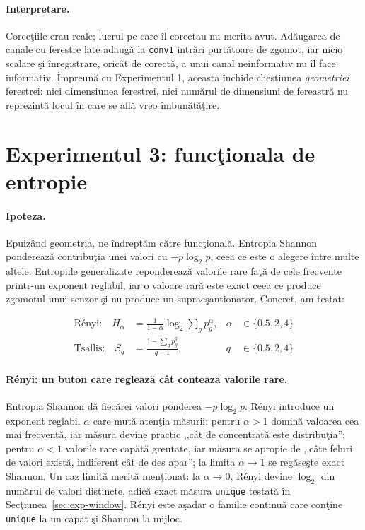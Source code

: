 \paragraph{Interpretare.} Corecţiile erau reale; lucrul pe care îl corectau nu
merita avut. Adăugarea de canale cu ferestre late adaugă la \texttt{conv1}
intrări purtătoare de zgomot, iar nicio scalare şi înregistrare, oricât de
corectă, a unui canal neinformativ nu îl face informativ. Împreună cu
Experimentul 1, aceasta închide chestiunea \emph{geometriei} ferestrei: nici
dimensiunea ferestrei, nici numărul de dimensiuni de fereastră nu reprezintă
locul în care se află vreo îmbunătăţire.

\section{Experimentul 3: funcţionala de entropie}
\label{sec:exp-entropy}

\paragraph{Ipoteza.} Epuizând geometria, ne îndreptăm către funcţională.
Entropia Shannon ponderează contribuţia unei valori cu $-p\log_2 p$, ceea ce
este o alegere între multe altele. Entropiile generalizate reponderează valorile
rare faţă de cele frecvente printr-un exponent reglabil, iar o valoare rară este
exact ceea ce produce zgomotul unui senzor şi nu produce un supraeşantionator.
Concret, am testat:

\begin{align}
  \text{Rényi:}   \quad H_\alpha &= \frac{1}{1-\alpha}\log_2 \sum_g p_g^{\alpha},
  & \alpha &\in \{0.5, 2, 4\} \label{eq:renyi}\\
  \text{Tsallis:} \quad S_q      &= \frac{1 - \sum_g p_g^{q}}{q-1},
  & q &\in \{0.5, 2, 4\} \label{eq:tsallis}
\end{align}

\paragraph{Rényi: un buton care reglează cât contează valorile rare.} Entropia
Shannon dă fiecărei valori ponderea $-p\log_2 p$. Rényi introduce un exponent
reglabil $\alpha$ care mută atenţia măsurii: pentru $\alpha > 1$ domină valoarea
cea mai frecventă, iar măsura devine practic ,,cât de concentrată este
distribuţia''; pentru $\alpha < 1$ valorile rare capătă greutate, iar măsura se
apropie de ,,câte feluri de valori există, indiferent cât de des apar''; la
limita $\alpha \to 1$ se regăseşte exact Shannon. Un caz limită merită
menţionat: la $\alpha \to 0$, Rényi devine $\log_2$ din numărul de valori
distincte, adică exact măsura \texttt{unique} testată în
Secţiunea~\ref{sec:exp-window}. Rényi este aşadar o familie continuă care
conţine \texttt{unique} la un capăt şi Shannon la mijloc.


